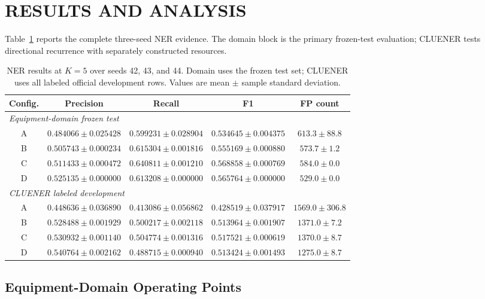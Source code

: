 \section{RESULTS AND ANALYSIS}

Table~\ref{tab:main-results} reports the complete three-seed NER evidence. The
domain block is the primary frozen-test evaluation; CLUENER tests directional
recurrence with separately constructed resources.

\begin{table}[ht]
\caption{NER results at $K=5$ over seeds 42, 43, and 44. Domain uses the
frozen test set; CLUENER uses all labeled official development rows. Values are
mean $\pm$ sample standard deviation.}
\label{tab:main-results}
\centering
\scriptsize
\setlength{\tabcolsep}{2.1pt}
\begin{tabular}{ccccc}
\toprule
Config. & Precision & Recall & F1 & FP count \\
\midrule
\multicolumn{5}{l}{\textit{Equipment-domain frozen test}} \\
A & $0.484066\pm0.025428$ & $0.599231\pm0.028904$ & $0.534645\pm0.004375$ & $613.3\pm88.8$ \\
B & $0.505743\pm0.000234$ & $0.615304\pm0.001816$ & $0.555169\pm0.000880$ & $573.7\pm1.2$ \\
C & $0.511433\pm0.000472$ & $0.640811\pm0.001210$ & $0.568858\pm0.000769$ & $584.0\pm0.0$ \\
D & $0.525135\pm0.000000$ & $0.613208\pm0.000000$ & $0.565764\pm0.000000$ & $529.0\pm0.0$ \\
\midrule
\multicolumn{5}{l}{\textit{CLUENER labeled development}} \\
A & $0.448636\pm0.036890$ & $0.413086\pm0.056862$ & $0.428519\pm0.037917$ & $1569.0\pm306.8$ \\
B & $0.528488\pm0.001929$ & $0.500217\pm0.002118$ & $0.513964\pm0.001907$ & $1371.0\pm7.2$ \\
C & $0.530932\pm0.001140$ & $0.504774\pm0.001316$ & $0.517521\pm0.000619$ & $1370.0\pm8.7$ \\
D & $0.540764\pm0.002162$ & $0.488715\pm0.000940$ & $0.513424\pm0.001493$ & $1275.0\pm8.7$ \\
\bottomrule
\end{tabular}
\end{table}

\subsection{Equipment-Domain Operating Points}

